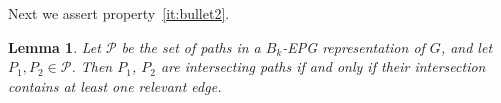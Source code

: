 \documentclass[
submission
]{dmtcs-episciences}
\newtheorem{lemma}[theorem]{Lemma}
\begin{document}
Next we assert property~\ref{it:bullet2}.

\begin{lemma}\label{lem:relevantEdges}
Let $\mathcal{P}$ be the set of paths in a $B_k$-EPG representation of $G$, and let $P_1, P_2\in \mathcal{P}$. Then $P_1$, $P_2$ are intersecting paths if and only if their intersection contains at least one relevant edge.
\end{lemma}







 
\end{document}
